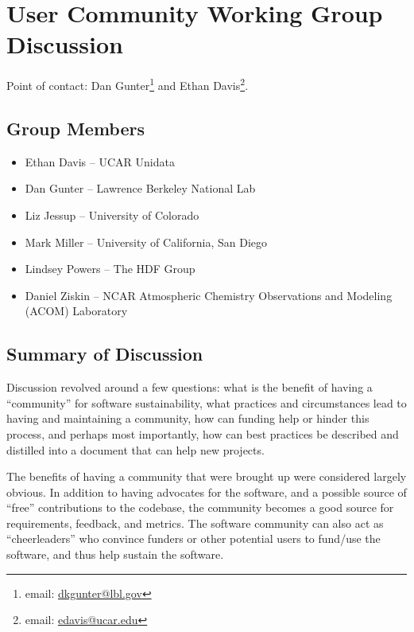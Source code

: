 \section{User Community Working Group Discussion}
\label{sec:appendix_user_community}

Point of contact:
Dan Gunter\footnote{email: \href{mailto:dkgunter@lbl.gov}{dkgunter@lbl.gov}} and 
Ethan Davis\footnote{email: \href{mailto:edavis@ucar.edu}{edavis@ucar.edu}}.

\subsection{Group Members}

\begin{itemize}
\item Ethan Davis -- UCAR Unidata
\item Dan Gunter -- Lawrence Berkeley National Lab
\item Liz Jessup -- University of Colorado
\item Mark Miller -- University of California, San Diego
\item Lindsey Powers -- The HDF Group
\item Daniel Ziskin -- NCAR Atmospheric Chemistry Observations and Modeling (ACOM) Laboratory
\end{itemize}

\subsection{Summary of Discussion}

Discussion revolved around a few questions: what is the benefit of having a
``community'' for software sustainability, what practices and circumstances lead
to having and maintaining a community, how can funding help or hinder this
process, and perhaps most importantly, how can best practices be described and
distilled into a document that can help new projects.

The benefits of having a community that were brought up were considered largely
obvious. In addition to having advocates for the software, and a possible source
of ``free'' contributions to the codebase, the community becomes a good source
for requirements, feedback, and metrics. The software community can also act as
``cheerleaders'' who convince funders or other potential users to fund/use the
software, and thus help sustain the software.

